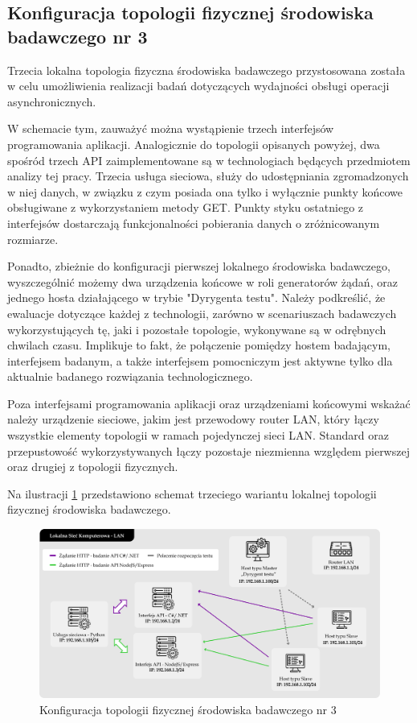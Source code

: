 \subsection*{Konfiguracja topologii fizycznej środowiska badawczego nr 3}
\label{sec:lokalne-srodowisko-badawcze-ver-3}
Trzecia lokalna topologia fizyczna środowiska badawczego przystosowana została w celu umożliwienia realizacji badań dotyczących wydajności obsługi operacji asynchronicznych.

W schemacie tym, zauważyć można wystąpienie trzech interfejsów programowania aplikacji. Analogicznie do topologii opisanych powyżej, dwa spośród trzech API zaimplementowane są w technologiach będących przedmiotem analizy tej pracy. Trzecia usługa sieciowa, służy do udostępniania zgromadzonych w niej danych, w związku z czym posiada ona tylko i wyłącznie punkty końcowe obsługiwane z wykorzystaniem metody GET. Punkty styku ostatniego z interfejsów dostarczają funkcjonalności pobierania danych o zróżnicowanym rozmiarze.

Ponadto, zbieżnie do konfiguracji pierwszej lokalnego środowiska badawczego, wyszczególnić możemy dwa urządzenia końcowe w roli generatorów żądań, oraz jednego hosta działającego w trybie "Dyrygenta testu". Należy podkreślić, że ewaluacje dotyczące każdej z technologii, zarówno w scenariuszach badawczych wykorzystujących tę, jaki i pozostałe topologie, wykonywane są w odrębnych chwilach czasu. Implikuje to fakt, że połączenie pomiędzy hostem badającym, interfejsem badanym, a także interfejsem pomocniczym jest aktywne tylko dla aktualnie badanego rozwiązania technologicznego.

Poza interfejsami programowania aplikacji oraz urządzeniami końcowymi wskażać należy urządzenie sieciowe, jakim jest przewodowy router LAN, który łączy wszystkie elementy topologii w ramach pojedynczej sieci LAN. Standard oraz przepustowość wykorzystywanych łączy pozostaje niezmienna względem pierwszej oraz drugiej z topologii fizycznych.

Na ilustracji \ref{fig:topologia-3} przedstawiono schemat trzeciego wariantu lokalnej topologii fizycznej środowiska badawczego.

\begin{figure}[ht]
    \centering
     \includegraphics[width=\linewidth]{rys04/topologia-3.png}
    \caption{Konfiguracja topologii fizycznej środowiska badawczego nr 3}
    \label{fig:topologia-3}
\end{figure}

